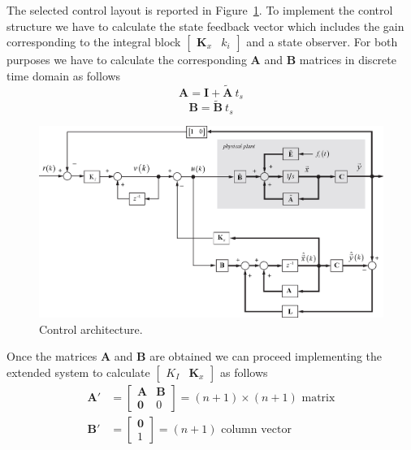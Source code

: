 \documentclass[11pt,a4paper,oneside]{book}
\numberwithin{equation}{section}
\theoremstyle{it}
\theoremstyle{definition}
\begin{document}
The selected control  layout is reported in Figure~\ref{figure_ctrl_coil_1}. To 
implement the control structure we have to calculate the state feedback vector 
which includes the gain corresponding to the integral block 
$\begin{bmatrix}\mathbf{K}_x&k_i\end{bmatrix}$ and a state observer. For both 
purposes we have to calculate the corresponding $\mathbf{A}$ and $\mathbf{B}$ 
matrices in discrete time domain as follows
\begin{equation}
	\mathbf{A} = \mathbf{I} + \tilde{\mathbf{A}} \ t_s
\end{equation}
\begin{equation}
	\mathbf{B} = \tilde{\mathbf{B}} \ t_s
\end{equation}
\begin{figure}[H]
	\centering
	\includegraphics[width = 460pt, angle = 0, 
	keepaspectratio]{figures/moving_coil/servo_linear_actuator_1.eps}
	\captionsetup{width=0.5\textwidth, font=small}		
	\caption{Control architecture.}
	\label{figure_ctrl_coil_1}
\end{figure}
Once the matrices $\mathbf{A}$ and $\mathbf{B}$ are obtained we can proceed 
implementing the extended system to calculate 
$\begin{bmatrix}K_I&\mathbf{K}_x\end{bmatrix}$ as follows
\begin{equation*}
	\begin{aligned}
		\mathbf{A'} &= 
		\begin{bmatrix}
			\mathbf{A} & \mathbf{B} \\[6pt]  
			\mathbf{0} & 0
		\end{bmatrix} = \text{$(n+1)\times(n+1)$ matrix} \\[6pt]
		\mathbf{B'} &= 
		\begin{bmatrix}
			\mathbf{0} \\[6pt]  
			1
		\end{bmatrix}= \text{$(n+1)$ column vector }
	\end{aligned}
\end{equation*}
\end{document}

